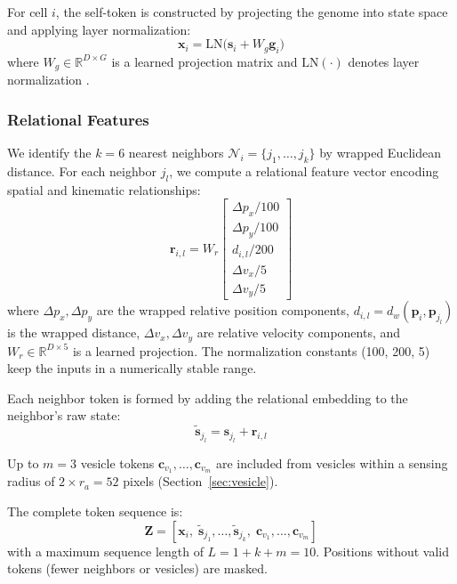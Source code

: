 \documentclass[10pt,twocolumn]{article}
\begin{document}
For cell $i$, the self-token is constructed by projecting the genome into state space and applying layer normalization:
\begin{equation}
  \mathbf{x}_i = \text{LN}\!\big(\mathbf{s}_i + W_g \mathbf{g}_i\big)
  \label{eq:self_token}
\end{equation}
where $W_g \in \mathbb{R}^{D \times G}$ is a learned projection matrix and $\text{LN}(\cdot)$ denotes layer normalization \cite{ba2016layer}.

\subsubsection{Relational Features}

We identify the $k = 6$ nearest neighbors $\mathcal{N}_i = \{j_1, \ldots, j_k\}$ by wrapped Euclidean distance.
For each neighbor $j_l$, we compute a relational feature vector encoding spatial and kinematic relationships:
\begin{equation}
  \mathbf{r}_{i,l} = W_r \begin{bmatrix} \Delta p_x / 100 \\ \Delta p_y / 100 \\ d_{i,l} / 200 \\ \Delta v_x / 5 \\ \Delta v_y / 5 \end{bmatrix}
  \label{eq:rel_features}
\end{equation}
where $\Delta p_x, \Delta p_y$ are the wrapped relative position components, $d_{i,l} = d_w(\mathbf{p}_i, \mathbf{p}_{j_l})$ is the wrapped distance, $\Delta v_x, \Delta v_y$ are relative velocity components, and $W_r \in \mathbb{R}^{D \times 5}$ is a learned projection.
The normalization constants (100, 200, 5) keep the inputs in a numerically stable range.

Each neighbor token is formed by adding the relational embedding to the neighbor's raw state:
\begin{equation}
  \tilde{\mathbf{s}}_{j_l} = \mathbf{s}_{j_l} + \mathbf{r}_{i,l}
  \label{eq:neighbor_token}
\end{equation}

Up to $m = 3$ vesicle tokens $\mathbf{c}_{v_1}, \ldots, \mathbf{c}_{v_m}$ are included from vesicles within a sensing radius of $2 \times r_a = 52$ pixels (Section~\ref{sec:vesicle}).

The complete token sequence is:
\begin{equation}
  \mathbf{Z} = [\mathbf{x}_i,\; \tilde{\mathbf{s}}_{j_1}, \ldots, \tilde{\mathbf{s}}_{j_k},\; \mathbf{c}_{v_1}, \ldots, \mathbf{c}_{v_m}]
  \label{eq:token_seq}
\end{equation}
with a maximum sequence length of $L = 1 + k + m = 10$. Positions without valid tokens (fewer neighbors or vesicles) are masked.
\end{document}
